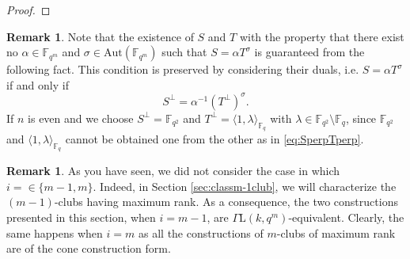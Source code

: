 \documentclass[11pt]{amsart}
\theoremstyle{definition}
\newtheorem{remark}[theorem]{Remark}
\newcommand{\F}{{\mathbb F}}
\newcommand{\fq}{{\mathbb F}_{q}}
\newcommand{\la}{\langle}
\newcommand{\ra}{\rangle}
\newcommand{\fqm}{\mathbb{F}_{q^m}}
\begin{document}
\begin{proof}
\end{proof}

\begin{remark}
    Note that the existence of $S$ and $T$ with the property that there exist no $\alpha \in \fqm$ and $\sigma \in \mathrm{Aut}(\fqm)$ such that $S=\alpha T^\sigma$ is guaranteed from the following fact. 
    This condition is preserved by considering their duals, i.e. $S=\alpha T^\sigma$ if and only if \begin{equation}\label{eq:SperpTperp}
    S^\perp=\alpha^{-1}(T^\perp)^\sigma.
    \end{equation}
    If $n$ is even and we choose $S^\perp=\F_{q^2}$ and $T^\perp=\la 1,\lambda\ra_{\fq}$ with $\lambda \in \F_{q^2}\setminus \fq$, since $\F_{q^2}$ and $\langle 1, \lambda \rangle_{\fq}$ cannot be obtained one from the other as in \eqref{eq:SperpTperp}.
\end{remark}

\begin{remark}
    As you have seen, we did not consider the case in which $i=\in \{m-1,m\}$.
    Indeed, in Section \ref{sec:classm-1club}, we will characterize the $(m-1)$-clubs having maximum rank. As a consequence, the two constructions presented in this section, when $i=m-1$, are $\Gamma\mathrm{L}(k,q^m)$-equivalent.
    Clearly, the same happens when $i=m$ as all the constructions of $m$-clubs of maximum rank are of the cone construction form.
\end{remark}
\end{document}
